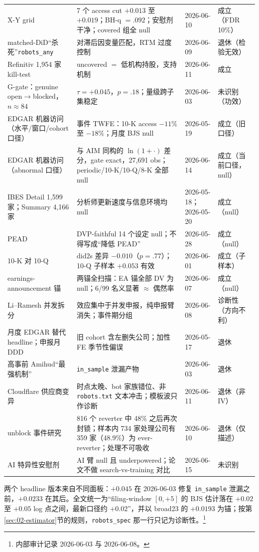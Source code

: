 \documentclass[a4paper,11pt]{ctexart}
\begin{document}
{\begin{longtable}{p{}p{}p{}p{}}
X-Y grid & 7 个 access cut $+0.013$ 至 $+0.019$；BH-q $=.092$；安慰剂干净；covered 组全 null & 2026-06-10 & 成立（FDR 10\%） \\
matched-DiD“杀死”\texttt{robots\_any} & 对滞后因变量匹配，RTM 过度控制 & 2026-06-09 & 退休（检验无效） \\
Refinitiv 1,954 家 kill-test & uncovered $=$ 低机构持股，支持机制 & 2026-06-11 & 成立 \\
G-gate：genuine open$\to$blocked，$n\approx 84$ & $\tau=+0.045$，$p=.18$；量级跨子集稳定 & 2026-06-03 & 未识别（功效） \\
EDGAR 机器访问（水平/窗口/cohort 口径） & 事件 TWFE：10-K access $-11\%$ 至 $-18\%$；月度 BJS null & 2026-05-19 & 成立（旧口径） \\
EDGAR 机器访问（abnormal 口径） & 与 AIM 同构的 $\ln(1+\cdot)$ 差分，gate exact，27,691 obs；periodic/10-K/10-Q/8-K 全部 null & 2026-06-14 & 成立（当前口径，null） \\
IBES Detail 1,599 家；Summary 4,166 家 & 分析师更新速度与信息环境均 null & 2026-05-18；2026-05-20 & 成立（null） \\
PEAD & DVP-faithful 14 个设定 null；不得写成“降低 PEAD” & 2026-05-28 & 成立（null） \\
10-K 对 10-Q & did2s 差异 $-0.010$（$p=.77$）；10-Q 子样本 $+0.053$ 有效 & 2026-06-01 & 成立（子样本） \\
earnings-announcement 锚 & 两锚全扫描：EA 锚全部 DV 为 null；6/99 名义显著 $\approx$ 偶然率 & 2026-06-07 & 成立（null） \\
Li--Ramesh 并发拆分 & 效应集中于并发申报，纯申报臂消失；事件期分组 & 2026-06-08 & 诊断性（方向不利） \\
月度 EDGAR 替代 headline；申报月 DDD & 旧 cohort 含左删失公司；加性 FE 季节性偏误 & 2026-05-17 & 退休 \\
高事前 Amihud“最强机制” & \texttt{in\_sample} 泄漏产物 & 2026-06-03 & 退休 \\
Cloudflare 供应商变异 & 时点太晚、bot 家族错位、非 \texttt{robots.txt} 文本冲击；模板波只作诊断 & 2026-06-11 & 退休（非 IV） \\
unblock 事件研究 & 816 个 reverter 中 48\% 之后再次封锁；样本内 734 家处理公司有 359 家（48.9\%）为 ever-reverter；处理不可吸收 & 2026-06-10 & 退休（仅描述） \\
AI 特异性安慰剂 & AI 臂 null 且 underpowered；论文不做 search-vs-training 对比 & 2026-06-15 & 未识别 \\
\end{longtable}
}

两个 headline 版本来自不同面板：$+0.045$ 在 2026-06-03 修复 \texttt{in\_sample} 泄漏之前，$+0.0233$ 在其后。全文统一为“filing-window $[0,+5]$ 的 BJS 估计落在 $+0.02$ 至 $+0.05$ log 点之间，最新口径约 $+0.02$”，并以 broad23 的 $+0.0193$ 为锚；按第\ref{sec:02-estimator}节的规则，\texttt{robots\_spec} 那一行只记为诊断性。\footnote{内部审计记录 2026-06-03 与 2026-06-08。}
\end{document}
